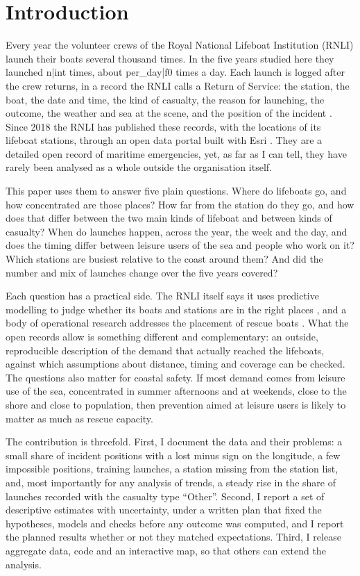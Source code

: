 \documentclass[11pt,a4paper]{article}
\begin{document}
\section{Introduction}
Every year the volunteer crews of the Royal National Lifeboat Institution (RNLI) launch their boats several thousand times. In the five years studied here they launched {{n|int}} times, about {{per_day|f0}} times a day. Each launch is logged after the crew returns, in a record the RNLI calls a Return of Service: the station, the boat, the date and time, the kind of casualty, the reason for launching, the outcome, the weather and sea at the scene, and the position of the incident \citep{wright2021}. Since 2018 the RNLI has published these records, with the locations of its lifeboat stations, through an open data portal built with Esri \citep{roberts2018,rnlidata}. They are a detailed open record of maritime emergencies, yet, as far as I can tell, they have rarely been analysed as a whole outside the organisation itself.

This paper uses them to answer five plain questions. Where do lifeboats go, and how concentrated are those places? How far from the station do they go, and how does that differ between the two main kinds of lifeboat and between kinds of casualty? When do launches happen, across the year, the week and the day, and does the timing differ between leisure users of the sea and people who work on it? Which stations are busiest relative to the coast around them? And did the number and mix of launches change over the five years covered?

Each question has a practical side. The RNLI itself says it uses predictive modelling to judge whether its boats and stations are in the right places \citep{wright2021}, and a body of operational research addresses the placement of rescue boats \citep{razi2016,akbari2018}. What the open records allow is something different and complementary: an outside, reproducible description of the demand that actually reached the lifeboats, against which assumptions about distance, timing and coverage can be checked. The questions also matter for coastal safety. If most demand comes from leisure use of the sea, concentrated in summer afternoons and at weekends, close to the shore and close to population, then prevention aimed at leisure users is likely to matter as much as rescue capacity.

The contribution is threefold. First, I document the data and their problems: a small share of incident positions with a lost minus sign on the longitude, a few impossible positions, training launches, a station missing from the station list, and, most importantly for any analysis of trends, a steady rise in the share of launches recorded with the casualty type ``Other''. Second, I report a set of descriptive estimates with uncertainty, under a written plan that fixed the hypotheses, models and checks before any outcome was computed, and I report the planned results whether or not they matched expectations. Third, I release aggregate data, code and an interactive map, so that others can extend the analysis.
\end{document}
